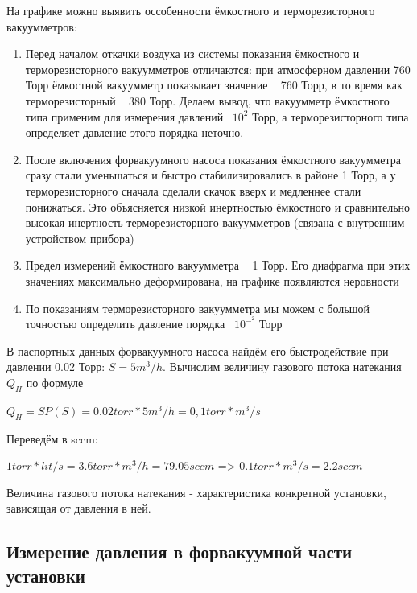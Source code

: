 \documentclass{article}
\begin{document}
На графике можно выявить оссобенности ёмкостного и терморезисторного вакуумметров:
\begin{enumerate}
\item Перед началом откачки воздуха из системы показания ёмкостного и терморезисторного вакуумметров отличаются: при атмосферном давлении 760 Торр ёмкостной вакуумметр показывает значение ~ 760 Торр, в то время как терморезисторный ~ 380 Торр. Делаем вывод, что вакуумметр ёмкостного типа применим для измерения давлений ~$10^2$ Торр, а терморезисторного типа определяет давление этого порядка неточно.
\item После включения форвакуумного насоса показания ёмкостного вакуумметра сразу стали уменьшаться и быстро стабилизировались в районе 1 Торр, а у терморезисторного сначала сделали скачок вверх и медленнее стали понижаться. Это объясняется низкой инертностью ёмкостного и сравнительно высокая инертность терморезисторного вакуумметров (связана с внутренним устройством прибора)
\item Предел измерений ёмкостного вакуумметра ~ 1 Торр. Его диафрагма при этих значениях максимально деформирована, на графике появляются неровности 
\item По показаниям терморезисторного вакуумметра мы можем с большой точностью определить давление порядка ~$10^-^2$ Торр
\end{enumerate}

В паспортных данных форвакуумного насоса найдём его быстродействие при давлении 0.02 Торр: $S = 5m^3/h$. Вычислим величину газового потока натекания $Q_H$ по формуле
\begin{center}
$Q_H = SP(S)=0.02torr*5m^3/h = 0,1 torr*m^3/s$
\end{center}
Переведём в sccm:
\begin{center}
$1 torr*lit/s = 3.6 torr*m^3/h = 79.05 sccm$ => $0.1 torr*m^3/s = 2.2 sccm$
\end{center}
Величина газового потока натекания - характеристика конкретной установки, зависящая от давления в ней.

\subsection{Измерение давления в форвакуумной части установки}
\end{document}
